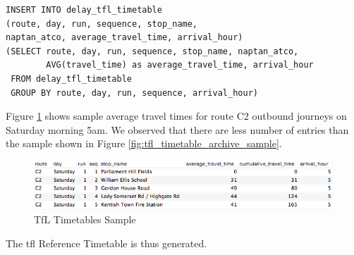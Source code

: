 \begin{enumerate}
\begin{verbatim}
INSERT INTO delay_tfl_timetable
(route, day, run, sequence, stop_name,
naptan_atco, average_travel_time, arrival_hour)
(SELECT route, day, run, sequence, stop_name, naptan_atco,
        AVG(travel_time) as average_travel_time, arrival_hour
 FROM delay_tfl_timetable
 GROUP BY route, day, run, sequence, arrival_hour)
\end{verbatim}

    Figure \ref{fig:tfl_timetable_sample} shows sample average travel times for route C2 outbound journeys on Saturday morning 5am. We observed that there are less number of entries than the sample shown in Figure \ref{fig:tfl_timetable_archive_sample}.

\begin{figure}
\centering
\includegraphics[width=\textwidth]{figures/delay_tfl_timetable_sample.png}
\caption{\label{fig:tfl_timetable_sample} TfL Timetables Sample}
\end{figure}

\end{enumerate}

The \acrshort{tfl} Reference Timetable is thus generated.



